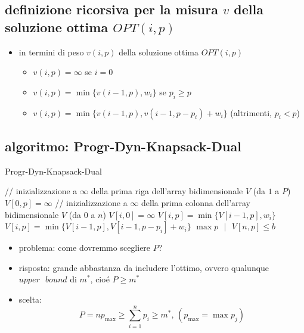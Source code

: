 
\subsection*{definizione ricorsiva per la misura $v$ della soluzione ottima $OPT(i,p)$}
\begin{flushleft}
	\begin{itemize}
		\item in termini di peso $v(i,p)$ della soluzione ottima $OPT(i,p)$
		\begin{itemize}
			\item $v(i,p)=\infty$ se $i=0$
			\item $v(i,p)=\min\{v(i-1,p),w_i\}$ se $p_i\geq p$
			\item $v(i,p)=\min\{v(i-1,p),v(i-1,p-p_i)+w_i\}$ (altrimenti, $p_i<p$)
		\end{itemize}
	\end{itemize}
\end{flushleft}


\newpage
\subsection*{algoritmo: Progr-Dyn-Knapsack-Dual}
\begin{flushleft}
	\begin{algorithm}
		\caption{Progr-Dyn-Knapsack-Dual}
		\begin{algorithmic}
			\STATE \color{gray} // inizializzazione a $\infty$ della prima riga dell'array bidimensionale $V$ (da $1$ a $P$) \color{black}
				\STATE $V[0,p]=\infty$
			\ENDFOR
			\STATE \color{gray} // inizializzazione a $\infty$ della prima colonna dell'array bidimensionale $V$ (da $0$ a $n$) \color{black}
				\STATE $V[i,0]=\infty$
			\ENDFOR
						\STATE $V[i,p]=\min\{V[i-1,p],w_i\}$
					\ELSE
						\STATE $V[i,p]=\min\{V[i-1,p],V[i-1,p-p_i]+w_i\}$
					\ENDIF
				\ENDFOR
			\ENDFOR
			\RETURN $\max p\text{ }\vert\text{ }V[n,p]\leq b$
		\end{algorithmic}
	\end{algorithm}
	\begin{itemize}
		\item problema: come dovremmo scegliere $P$?
		\item risposta: grande abbastanza da includere l'ottimo, ovvero qualunque $upper\text{ }bound$ di $m^*$, cio\'e $P\geq m^*$
		\item scelta:
			$$P=np_{\max}\geq\sum_{i=1}^np_i\geq m^*\text{, }(p_{\max}=\max p_j)$$
	\end{itemize}
\end{flushleft}

